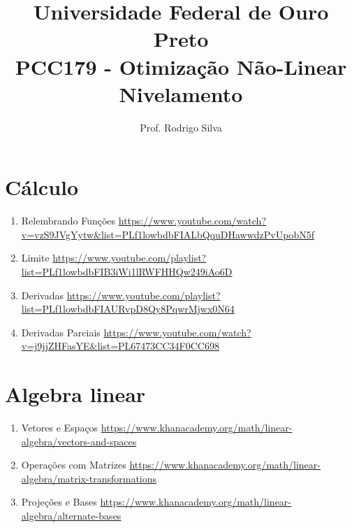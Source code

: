 \documentclass{article}
\title{\vspace{-2 cm}Universidade Federal de Ouro Preto \\ PCC179 - Otimização Não-Linear \\ Nivelamento}
\author{Prof. Rodrigo Silva}
\begin{document}
\maketitle

\section{Cálculo}

\begin{enumerate}
    \item Relembrando Funções \url{https://www.youtube.com/watch?v=vzS9JVgYytw&list=PLf1lowbdbFIALbQquDHawwdzPvUpobN5f}
    \item Limite \url{https://www.youtube.com/playlist?list=PLf1lowbdbFIB3iWi1lRWFHHQw249iAo6D}
    \item Derivadas \url{https://www.youtube.com/playlist?list=PLf1lowbdbFIAURvpD8Qy8PqwrMjwx0N64}
    \item Derivadas Parciais \url{https://www.youtube.com/watch?v=j9jjZHFasYE&list=PL67473CC34F0CC698}
\end{enumerate}

\section{Algebra linear}

\begin{enumerate}
    \item Vetores e Espaços \url{https://www.khanacademy.org/math/linear-algebra/vectors-and-spaces}
    \item Operações com Matrizes \url{https://www.khanacademy.org/math/linear-algebra/matrix-transformations}
    \item Projeções e Bases \url{https://www.khanacademy.org/math/linear-algebra/alternate-bases}
\end{enumerate}




%
%
\end{document}
